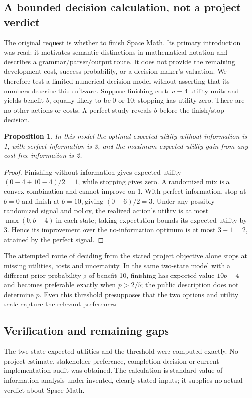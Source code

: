 \documentclass[11pt]{article}
\newtheorem{proposition}{Proposition}
\begin{document}
\subsection{A bounded decision calculation, not a project verdict}
The original request is whether to finish Space Math. Its primary introduction was read: it motivates semantic distinctions in mathematical notation and describes a grammar/parser/output route. It does not provide the remaining development cost, success probability, or a decision-maker's valuation. We therefore test a limited numerical decision model without asserting that its numbers describe this software.
Suppose finishing costs $c=4$ utility units and yields benefit $b$, equally likely to be 0 or 10; stopping has utility zero. There are no other actions or costs. A perfect study reveals $b$ before the finish/stop decision.
\begin{proposition}
In this model the optimal expected utility without information is 1, with perfect information is 3, and the maximum expected utility gain from any cost-free information is 2.
\end{proposition}
\begin{proof}
Finishing without information gives expected utility $(0-4+10-4)/2=1$, while stopping gives zero. A randomized mix is a convex combination and cannot improve on 1. With perfect information, stop at $b=0$ and finish at $b=10$, giving $(0+6)/2=3$. Under any possibly randomized signal and policy, the realized action's utility is at most $\max(0,b-4)$ in each state; taking expectation bounds its expected utility by 3. Hence its improvement over the no-information optimum is at most $3-1=2$, attained by the perfect signal.
\end{proof}
The attempted route of deciding from the stated project objective alone stops at missing utilities, costs and uncertainty. In the same two-state model with a different prior probability $p$ of benefit 10, finishing has expected value $10p-4$ and becomes preferable exactly when $p>2/5$; the public description does not determine $p$. Even this threshold presupposes that the two options and utility scale capture the relevant preferences.
\subsection{Verification and remaining gaps}
The two-state expected utilities and the threshold were computed exactly. No project estimate, stakeholder preference, completion decision or current implementation audit was obtained. The calculation is standard value-of-information analysis under invented, clearly stated inputs; it supplies no actual verdict about Space Math.
\end{document}
